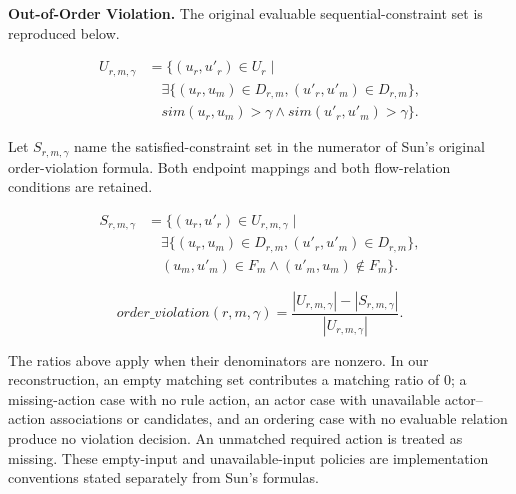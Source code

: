 \textbf{Out-of-Order Violation.} The original evaluable sequential-constraint set is reproduced below.

\begin{equation}
\begin{aligned}
U_{r,m,\gamma}
&=\bigl\{(u_r,u'_r)\in U_r\mid\\
&\quad\exists\bigl\{(u_r,u_m)\in D_{r,m},
  (u'_r,u'_m)\in D_{r,m}\bigr\},\\
&\quad sim(u_r,u_m)>\gamma
  \land sim(u'_r,u'_m)>\gamma\bigr\}.
\end{aligned}
\label{eq:order_evaluable}
\end{equation}

Let \(S_{r,m,\gamma}\) name the satisfied-constraint set in the numerator of Sun's original order-violation formula. Both endpoint mappings and both flow-relation conditions are retained.

\begin{equation}
\begin{aligned}
S_{r,m,\gamma}
&=\bigl\{(u_r,u'_r)\in U_{r,m,\gamma}\mid\\
&\quad\exists\bigl\{(u_r,u_m)\in D_{r,m},
  (u'_r,u'_m)\in D_{r,m}\bigr\},\\
&\quad(u_m,u'_m)\in F_m
  \land(u'_m,u_m)\notin F_m\bigr\}.
\end{aligned}
\label{eq:order_satisfied}
\end{equation}

\begin{equation}
\mathit{order\_violation}(r,m,\gamma)
=\frac{|U_{r,m,\gamma}|-|S_{r,m,\gamma}|}{|U_{r,m,\gamma}|}.
\label{eq:order}
\end{equation}

The ratios above apply when their denominators are nonzero. In our reconstruction, an empty matching set contributes a matching ratio of \(0\); a missing-action case with no rule action, an actor case with unavailable actor--action associations or candidates, and an ordering case with no evaluable relation produce no violation decision. An unmatched required action is treated as missing. These empty-input and unavailable-input policies are implementation conventions stated separately from Sun's formulas.
